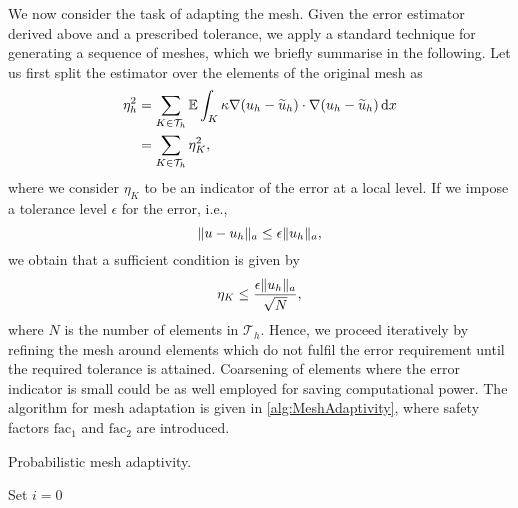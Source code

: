 \documentclass[10pt]{article}
\begin{document}
We now consider the task of adapting the mesh. Given the error estimator derived above and a prescribed tolerance, we apply a standard technique for generating a sequence of meshes, which we briefly summarise in the following. Let us first split the estimator over the elements of the original mesh as
\begin{equation}
\begin{aligned}
	\eta_h^2 &= \sum_{K\in \mathcal T_h} \operatorname{\mathbb{E}} \int_{K} \kappa \nabla (u_h - \widetilde u_h) \cdot \nabla (u_h - \widetilde u_h) \, \mathrm{d} x\\
	&= \sum_{K \in \mathcal T_h} \eta_K^2,
\end{aligned}
\end{equation}
where we consider $\eta_K$ to be an indicator of the error at a local level. If we impose a tolerance level $\epsilon$ for the error, i.e.,
\begin{equation}
	\lVert u - u_h\rVert_a \leq \epsilon \lVert u_h\rVert_a,  
\end{equation}	 
we obtain that a sufficient condition is given by 
\begin{equation}
	\eta_K \leq \frac{\epsilon \lVert u_h\rVert_a}{\sqrt{N}},
\end{equation}
where $N$ is the number of elements in $\mathcal T_h$. Hence, we proceed iteratively by refining the mesh around elements which do not fulfil the error requirement until the required tolerance is attained. Coarsening of elements where the error indicator is small could be as well employed for saving computational power. The algorithm for mesh adaptation is given in \cref{alg:MeshAdaptivity}, where safety factors $\mathrm{fac}_1$ and $\mathrm{fac}_2$ are introduced. 

\begin{algorithm}[t]
	\caption{Probabilistic mesh adaptivity.}
	\label{alg:MeshAdaptivity}
	Set $i = 0$ \;
\end{algorithm}
\end{document}
